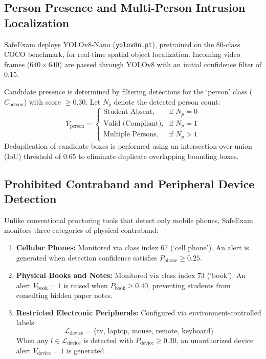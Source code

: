 \documentclass[conference]{IEEEtran}
\begin{document}
\subsection{Person Presence and Multi-Person Intrusion Localization}
SafeExam deploys YOLOv8-Nano (\texttt{yolov8n.pt}), pretrained on the 80-class COCO benchmark, for real-time spatial object localization. Incoming video frames ($640 \times 640$) are passed through YOLOv8 with an initial confidence filter of $0.15$.

Candidate presence is determined by filtering detections for the `person' class ($C_{\text{person}}$) with score $\ge 0.30$. Let $N_p$ denote the detected person count:
\begin{equation}
V_{\text{person}} = 
\begin{cases} 
\text{Student Absent}, & \text{if } N_p = 0 \\
\text{Valid (Compliant)}, & \text{if } N_p = 1 \\
\text{Multiple Persons}, & \text{if } N_p > 1 
\end{cases}
\label{eq:person}
\end{equation}
Deduplication of candidate boxes is performed using an intersection-over-union (IoU) threshold of $0.65$ to eliminate duplicate overlapping bounding boxes.

\subsection{Prohibited Contraband and Peripheral Device Detection}
Unlike conventional proctoring tools that detect only mobile phones, SafeExam monitors three categories of physical contraband:
\begin{enumerate}
    \item \textbf{Cellular Phones:} Monitored via class index 67 (`cell phone'). An alert is generated when detection confidence satisfies $P_{\text{phone}} \ge 0.25$.
    \item \textbf{Physical Books and Notes:} Monitored via class index 73 (`book'). An alert $V_{\text{book}} = 1$ is raised when $P_{\text{book}} \ge 0.40$, preventing students from consulting hidden paper notes.
    \item \textbf{Restricted Electronic Peripherals:} Configured via environment-controlled labels:
    \begin{equation*}
    \mathcal{L}_{\text{device}} = \{\text{tv, laptop, mouse, remote, keyboard}\}
    \end{equation*}
    When any $l \in \mathcal{L}_{\text{device}}$ is detected with $P_{\text{device}} \ge 0.30$, an unauthorized device alert $V_{\text{device}} = 1$ is generated.
\end{enumerate}
\end{document}
